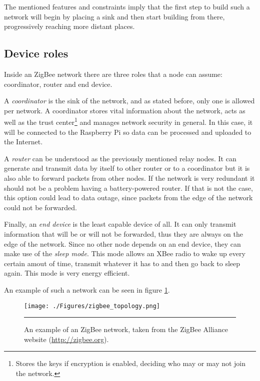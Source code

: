 The mentioned features and constraints imply that the first step to build such a network will begin by placing a sink and then start building from there, progressively reaching more distant places.

\subsection{Device roles}

Inside an ZigBee network there are three roles that a node can assume: coordinator, router and end device.

A \emph{coordinator} is the sink of the network, and as stated before, only one is allowed per network. A coordinator stores vital information about the network, acts as well as the trust center\footnote{Stores the keys if encryption is enabled, deciding who may or may not join the network.} and manages network security in general\citep{sensornetworktc}. In this case, it will be connected to the Raspberry Pi so data can be processed and uploaded to the Internet.

A \emph{router} can be understood as the previously mentioned relay nodes. It can generate and transmit data by itself to other router or to a coordinator but it is also able to forward packets from other nodes. If the network is very redundant it should not be a problem having a battery-powered router. If that is not the case, this option could lead to data outage, since packets from the edge of the network could not be forwarded.

Finally, an \emph{end device} is the least capable device of all. It can only transmit information that will be or will not be forwarded, thus they are always on the edge of the network. Since no other node depends on an end device, they can make use of the \emph{sleep mode}. This mode allows an XBee radio to wake up every certain amout of time, transmit whatever it has to and then go back to sleep again. This mode is very energy efficient.

An example of such a network can be seen in figure \ref{fig:ZBeeNet}.

\begin{figure}[htbp]
    \centering
        \texttt{[image: ./Figures/zigbee\_topology.png]}
        \rule{35em}{0.5pt}
        \caption[ZigBee network example]{An example of an ZigBee network, taken from the ZigBee Alliance website (\url{http://zigbee.org}).}
    \label{fig:ZBeeNet}
\end{figure}

